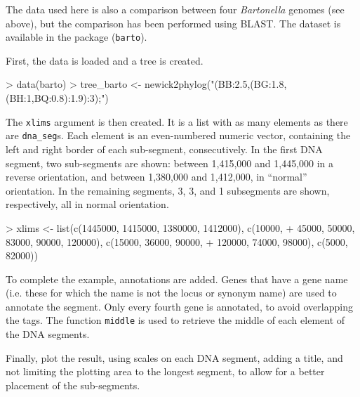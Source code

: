 \documentclass[a4paper]{article}
\newcommand{\code}[1]{\texttt{#1}}
\begin{document}
The data used here is also a comparison between four \emph{Bartonella} genomes
(see above), but the comparison has been performed using BLAST. The dataset
is available in the package (\code{barto}).

First, the data is loaded and a tree is created. 

\begin{Schunk}
\begin{Sinput}
> data(barto)
> tree_barto <- newick2phylog("(BB:2.5,(BG:1.8,(BH:1,BQ:0.8):1.9):3);")
\end{Sinput}
\end{Schunk}

The \code{xlims} argument is then created. It is a list with as many elements
as there are \code{dna\_seg}s. Each element is an even-numbered numeric 
vector, containing the left and right border of each sub-segment, 
consecutively. In the first DNA segment, two sub-segments are shown: between
1,415,000 and 1,445,000 in a reverse orientation, and between 1,380,000 and
1,412,000, in ``normal'' orientation. In the remaining segments, 3, 3, and 1 
subsegments are shown, respectively, all in normal orientation.

\begin{Schunk}
\begin{Sinput}
> xlims <- list(c(1445000, 1415000, 1380000, 1412000), c(10000, 
+     45000, 50000, 83000, 90000, 120000), c(15000, 36000, 90000, 
+     120000, 74000, 98000), c(5000, 82000))
\end{Sinput}
\end{Schunk}

To complete the example, annotations are added. Genes that have a gene name 
(i.e. these for which the name is not the locus or synonym name) are used
to annotate the segment. Only every fourth gene is annotated, to avoid
overlapping the tags. The function \code{middle} is used to retrieve the 
middle of each element of the DNA segments.

\begin{Schunk}
\end{Schunk}

Finally, plot the result, using scales on each DNA segment, adding a title,
and not limiting the plotting area to the longest segment, to allow for a better
placement of the sub-segments.
\end{document}
